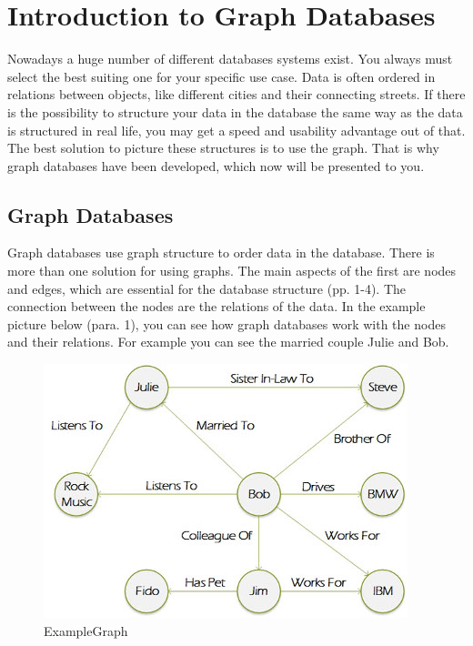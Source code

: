 \section{Introduction to Graph Databases}

Nowadays a huge number of different databases systems exist. You always must select the best suiting one for your specific use case. Data is often ordered in relations between objects, like different cities and their connecting streets. 
If there is the possibility to structure your data in the database the same way as the data is structured in real life, you may get a speed and usability advantage out of that. The best solution to picture these structures is to use the graph. That is why graph databases have been developed, which now will be presented to you.

\subsection{Graph Databases}

Graph databases use graph structure to order data in the database. There is more than one solution for using graphs. The main aspects of the first are nodes and edges, which are essential for the database structure \cite{RobinsonWebberEifrem.2013}(pp. 1-4).
The connection between the nodes are the relations of the data. In the example picture below \cite{Rouse.2016}(para. 1), you can see how graph databases work with the nodes and their relations. For example you can see the married couple Julie and Bob.

\begin{figure}[H]
	\includegraphics[width=\linewidth,keepaspectratio]{images/neo4j/IntroExampleGraph.JPG}
	\caption{ExampleGraph}
\end{figure}

